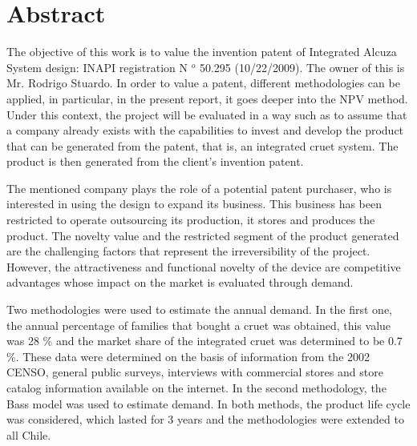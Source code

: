 
%


\section*{Abstract}
The objective of this work is to value the invention patent of Integrated Alcuza System design: INAPI registration N $^{o}$ 50.295 (10/22/2009). The owner of this is Mr. Rodrigo Stuardo. In order to value a patent, different methodologies can be applied, in particular, in the present report, it goes deeper into the NPV method. Under this context, the project will be evaluated in a way such as to assume that a company already exists with the capabilities to invest and develop the product that can be generated from the patent, that is, an integrated cruet system. The product is then generated from the client's invention patent.

The mentioned company plays the role of a potential patent purchaser, who is interested in using the design to expand its business. This business has been restricted to operate outsourcing its production, it stores and produces the product. The novelty value and the restricted segment of the product generated are the challenging factors that represent the irreversibility of the project. However, the attractiveness and functional novelty of the device are competitive advantages whose impact on the market is evaluated through demand.

Two methodologies were used to estimate the annual demand. In the first one, the annual percentage of families that bought a cruet was obtained, this value was 28 \% and the market share of the integrated cruet was determined to be 0.7 \%. These data were determined on the basis of information from the 2002 CENSO, general public surveys, interviews with commercial stores and store catalog information available on the internet. In the second methodology, the Bass model was used to estimate demand. In both methods, the product life cycle was considered, which lasted for 3 years and the methodologies were extended to all Chile.

